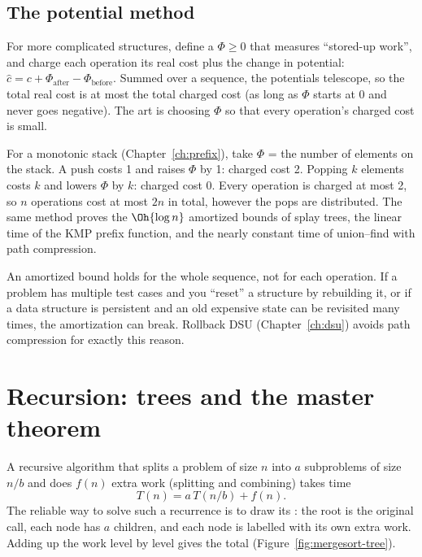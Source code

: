 \subsection{The potential method}

For more complicated structures, define a  $\Phi \ge 0$ that measures ``stored-up work'', and charge each
operation its real cost plus the change in potential: $\hat c = c + \Phi_{\text{after}} - \Phi_{\text{before}}$. Summed
over a sequence, the potentials telescope, so the total real cost is at most the total charged cost (as long as $\Phi$
starts at 0 and never goes negative). The art is choosing $\Phi$ so that every operation's charged cost is small.

For a monotonic stack (Chapter~\ref{ch:prefix}), take $\Phi$ = the number of elements on the stack. A push costs 1 and
raises $\Phi$ by 1: charged cost 2. Popping $k$ elements costs $k$ and lowers $\Phi$ by $k$: charged cost 0. Every
operation is charged at most 2, so $n$ operations cost at most $2n$ in total, however the pops are distributed. The same
method proves the $\Oh{\log n}$ amortized bounds of splay trees, the linear time of the KMP prefix function, and the nearly
constant time of union--find with path compression.

\begin{pitfall}
An amortized bound holds for the whole sequence, not for each operation. If a problem has multiple test cases and you
``reset'' a structure by rebuilding it, or if a data structure is persistent and an old expensive state can be revisited
many times, the amortization can break. Rollback DSU (Chapter~\ref{ch:dsu}) avoids path compression for exactly this reason.
\end{pitfall}

\section[Recursion]{Recursion: trees and the master theorem \hfill \gold}\label{sec:recursion}

A recursive algorithm that splits a problem of size $n$ into $a$ subproblems of size $n/b$ and does $f(n)$ extra work
(splitting and combining) takes time
\[ T(n) = a\,T(n / b) + f(n). \]
The reliable way to solve such a recurrence is to draw its : the root is the original call, each node
has $a$ children, and each node is labelled with its own extra work. Adding up the work level by level gives the total
(Figure~\ref{fig:mergesort-tree}).

